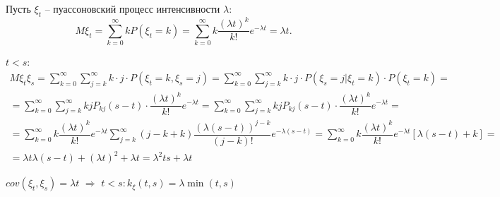 \begin{ex}
  Пусть $\xi_t$ -- пуассоновский процесс интенсивности $\lambda$:
  \[
    M\xi_t = \sum_{k=0}^\infty k P(\xi_t = k) = \sum_{k=0}^\infty k \dfrac{(\lambda t)^k}{k!} e^{-\lambda t} = \lambda t.
  \]

  $t<s$:
  \begin{multline*}
    M\xi_t \xi_s = \sum_{k=0}^\infty \sum_{j=k}^\infty k\cdot j \cdot P(\xi_t = k, \xi_s = j)
    = \sum_{k=0}^\infty \sum_{j=k}^\infty k \cdot j \cdot P(\xi_s=j | \xi_t=k) \cdot P(\xi_t = k) = \\
    = \sum_{k=0}^\infty \sum_{j=k}^\infty kj P_{kj}(s-t) \cdot \dfrac{(\lambda t)^k}{k!} e^{-\lambda t}
    = \sum_{k=0}^\infty \sum_{j=k}^\infty kj P_{kj}(s-t) \cdot \dfrac{(\lambda t)^k}{k!} e^{-\lambda t} = \\
    = \sum_{k=0}^\infty k \dfrac{(\lambda t)^k}{k!} e^{-\lambda t}
    \sum_{j=k}^\infty (j-k+k) \dfrac{(\lambda(s-t))^{j-k}}{(j-k)!} e^{- \lambda (s-t)}
    = \sum_{k=0}^\infty k \dfrac{(\lambda t)^k}{k!} e^{-\lambda t} [\lambda(s-t) + k] = \\
    = \lambda t \lambda (s-t) + (\lambda t)^2 + \lambda t = \lambda^2 t s + \lambda t
  \end{multline*}

  $cov(\xi_t, \xi_s) = \lambda t$ $\Rightarrow$ $t < s : k_\xi (t, s) = \lambda \min(t, s)$
\end{ex}
